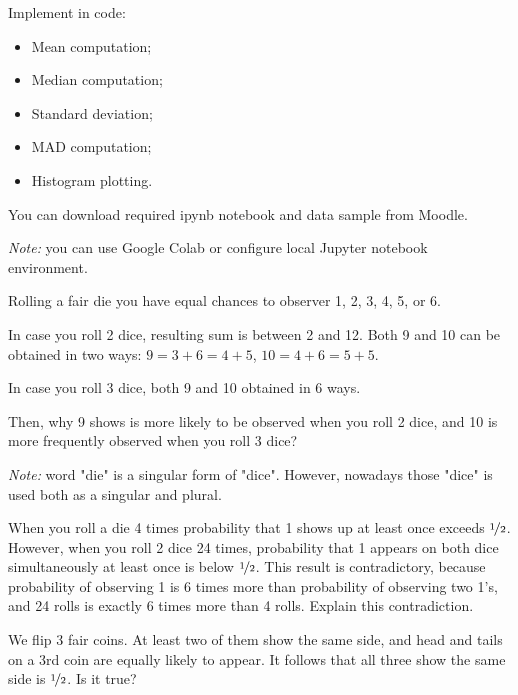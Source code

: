 \documentclass[14pt]{exam}
\begin{document}
\begin{questions}
		
		\question
		Implement in code:
		\begin{itemize}
			\item Mean computation;
			\item Median computation;
			\item Standard deviation;
			\item MAD computation;
			\item Histogram plotting.
		\end{itemize}
		
		You can download required ipynb notebook and data sample from Moodle.
		
		\textit{Note:} you can use Google Colab or configure local Jupyter notebook environment.
		
		\question
		Rolling a fair die you have equal chances to observer 1, 2, 3, 4, 5, or 6.
		
		In case you roll 2 dice, resulting sum is between 2 and 12. Both 9 and 10 can be obtained in two ways: $9 = 3 + 6 = 4 + 5$, $10 = 4 + 6 = 5 + 5$.
		
		In case you roll 3 dice, both 9 and 10 obtained in 6 ways. 
		
		Then, why 9 shows is more likely to be observed when you roll 2 dice, and 10 is more frequently observed when you roll 3 dice?
		
		\textit{Note:} word "die" is a singular form of "dice". However, nowadays those "dice" is used both as a singular and plural.
		
		\question
		When you roll a die 4 times probability that 1 shows up at least once exceeds $\nicefrac{1}{2}$. However, when you roll 2 dice 24 times, probability that 1 appears on both dice simultaneously at least once is below $\nicefrac{1}{2}$. This result is contradictory, because probability of observing 1 is 6 times more than probability of observing two 1's, and 24 rolls is exactly 6 times more than 4 rolls. Explain this contradiction.
		
		\question
		We flip 3 fair coins. At least two of them show the same side, and head and tails on a 3rd coin are equally likely to appear. It follows that all three show the same side is $\nicefrac{1}{2}$. Is it true?
	\end{questions}
\end{document}
